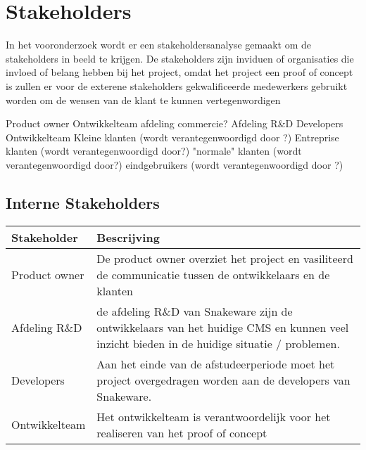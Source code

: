 \section{Stakeholders}
In het vooronderzoek wordt er een stakeholdersanalyse gemaakt om de stakeholders in beeld te krijgen.
De stakeholders zijn inviduen of organisaties die invloed of belang hebben bij het project, 
omdat het project een proof of concept is zullen er voor de exterene stakeholders gekwalificeerde medewerkers gebruikt worden om de wensen van de klant te kunnen vertegenwordigen

Product owner
Ontwikkelteam
afdeling commercie?
Afdeling R&D
Developers
Ontwikkelteam
Kleine klanten (wordt verantegenwoordigd door ?)
Entreprise klanten (wordt verantegenwoordigd door?)
"normale" klanten (wordt verantegenwoordigd door?)
eindgebruikers (wordt verantegenwoordigd door ?)
\subsection{Interne Stakeholders}
\begin{tabular}{ | p{3cm} | p{9cm} | }
    \hline
    \textbf{Stakeholder} & \textbf{Bescrijving} \\ 
    \hline
    Product owner & De product owner overziet het project en vasiliteerd de communicatie tussen de ontwikkelaars en de klanten \\
    \hline
    Afdeling R\&D  & de afdeling R\&D van Snakeware zijn de ontwikkelaars van het huidige CMS en kunnen veel inzicht bieden in de huidige situatie / problemen.  \\ 
    \hline
    Developers & Aan het einde van de afstudeerperiode moet het project overgedragen worden aan de developers van Snakeware.\\
    \hline
    Ontwikkelteam & Het ontwikkelteam is verantwoordelijk voor het realiseren van het proof of concept\\
    \hline
\end{tabular}


